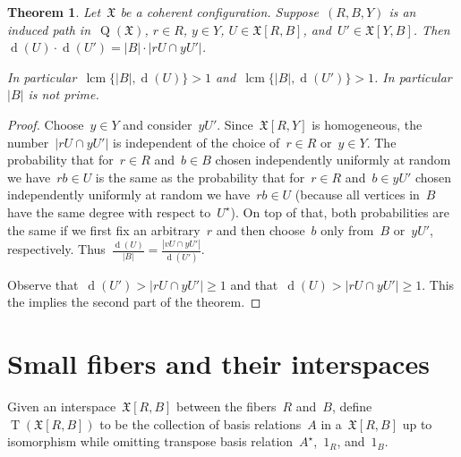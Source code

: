 \documentclass[english,a4paper]{article}
\theoremstyle{plain}
\newtheorem{theorem}             {Theorem}[section]
\theoremstyle{definition}
\newcommand{\abs}[1]{| #1 |}
\DeclareMathOperator{\lcm}{lcm}
\newcommand{\coherentConfig}{\ensuremath{\mathfrak{X}}}
\newcommand{\interspace}[2]{\ensuremath{\coherentConfig[#1,#2]}}
\newcommand{\intDegree}[1]{\ensuremath{\Deg \left( #1 \right)}}
\DeclareMathOperator*{\Type}{T}
\newcommand{\type}[1]{\ensuremath{\Type\left(#1\right)}}
\newcommand{\arcs}{\ensuremath{A}}
\DeclareMathOperator*{\Quotient}{Q}
\newcommand{\quotientGraph}[1]{\ensuremath{\Quotient(#1)}}
\DeclareMathOperator{\Deg}{d}
\begin{document}
\begin{theorem}
\label{interspace-divisor/thm}
    Let~$\coherentConfig$ be a coherent configuration.
    Suppose~$(R,B,Y)$ is an induced path in~$\quotientGraph{\coherentConfig}$, $r \in R$, $y \in Y$, $U \in \interspace{R}{B}$, and~$U' \in \interspace{Y}{B}$.
    Then~$\intDegree{U} \cdot \intDegree{U'} = \abs{B} \cdot \abs{rU \cap yU'}$.

    In particular~$\lcm\{\abs{B}, \intDegree{U}\}>1$ and~$\lcm\{\abs{B}, \intDegree{U'}\}>1$. In particular~$\abs{B}$ is not prime.
\end{theorem}
\begin{proof}
    Choose~$y \in Y$ and consider~$yU'$.
    Since~$\interspace{R}{Y}$ is homogeneous, the number~$\abs{rU \cap yU'}$ is independent of the choice of~$r \in R$ or~$y \in Y$.
    The probability that for~$r \in R$ and~$b \in B$ chosen independently uniformly at random we have~$rb \in U$ is the same as the probability that for~$r \in R$ and~$b \in yU'$ chosen independently uniformly at random we have~$rb \in U$ (because all vertices in~$B$ have the same degree with respect to~$U^\star$).
    On top of that, both probabilities are the same if we first fix an arbitrary~$r$ and then choose~$b$ only  from~$B$ or~$yU'$, respectively.
    Thus~$\frac{\intDegree{U}}{\abs{B}} = \frac{\abs{vU \cap yU'}}{\intDegree{U'}}$.

    Observe that~$\intDegree{U'} > \abs{rU \cap yU'} \geq 1$ and that~$\intDegree{U} > \abs{rU \cap y U'} \geq 1$. This the implies the second part of the theorem.
\end{proof}
     

\section{Small fibers and their interspaces}
\label{small-cc/sec}


Given an interspace~$\interspace{R}{B}$ between the fibers~$R$ and~$B$, define~$\type{\interspace{R}{B}}$ to be the collection of basis relations~$\arcs$ in a~$\interspace{R}{B}$ up to isomorphism while omitting transpose basis relation~$\arcs^\star$,~$1_R$, and~$1_B$.
\end{document}

